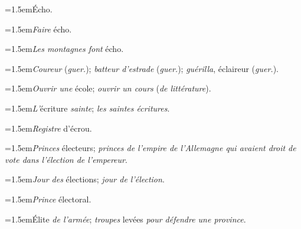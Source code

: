 \par{\dictfontsize\hangindent=1.5em\noindent Écho. \par}
\par{\dictfontsize\hangindent=1.5em\noindent \textit{Faire} écho. \par}
\par{\dictfontsize\hangindent=1.5em\noindent \textit{Les montagnes font} écho. \par}
\par{\dictfontsize\hangindent=1.5em\noindent \textit{Coureur} (\textit{guer.}); \textit{batteur d’estrade} (\textit{guer.}); \textit{guérilla}, éclaireur (\textit{guer.}). \par}
\par{\dictfontsize\hangindent=1.5em\noindent \textit{Ouvrir une} école; \textit{ouvrir un cours} (\textit{de littérature}). \par}
\par{\dictfontsize\hangindent=1.5em\noindent \textit{L’}écriture \textit{sainte}; \textit{les saintes écritures}. \par}
\par{\dictfontsize\hangindent=1.5em\noindent \textit{Registre} d’écrou. \par}
\par{\dictfontsize\hangindent=1.5em\noindent \textit{Princes} électeurs; \textit{princes de l’empire de l’Allemagne qui avaient droit de vote dans l’élection de l’empereur}. \par}
\par{\dictfontsize\hangindent=1.5em\noindent \textit{Jour des} élections; \textit{jour de l’élection}. \par}
\par{\dictfontsize\hangindent=1.5em\noindent \textit{Prince} électoral. \par}
\par{\dictfontsize\hangindent=1.5em\noindent Élite \textit{de l’armée}; \textit{troupes} levées \textit{pour défendre une province}. \par}
